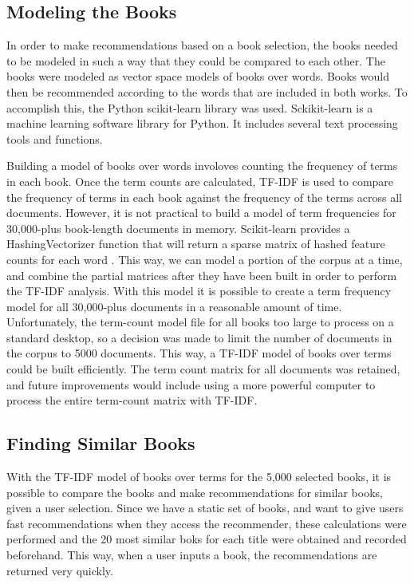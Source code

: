 \documentclass[10pt]{report}
\begin{document}
\subsection*{Modeling the Books}
In order to make recommendations based on a book selection, the books needed to be modeled in such a way that they could be compared to each other. The books were modeled as vector space models of books over words. Books would then be recommended according to the words that are included in both works. To accomplish this, the Python scikit-learn library was used. Sckikit-learn is a machine learning software library for Python. It includes several text processing tools and functions. 

Building a model of books over words involoves counting the frequency of terms in each book. Once the term counts are calculated, TF-IDF is used to compare the frequency of terms in each book against the frequency of the terms across all documents. However, it is not practical to build a model of term frequencies for 30,000-plus book-length documents in memory. Scikit-learn provides a HashingVectorizer function that will return a sparse matrix of hashed feature counts for each word \cite{scikit}. This way, we can model a portion of the corpus at a time, and combine the partial matrices after they have been built in order to perform the TF-IDF analysis. With this model it is possible to create a term frequency model for all 30,000-plus documents in a reasonable amount of time. Unfortunately, the term-count model file for all books too large to process on a standard desktop, so a decision was made to limit the number of documents in the corpus to 5000 documents. This way, a TF-IDF model of books over terms could be built efficiently. The term count matrix for all documents was retained, and future improvements would include using a more powerful computer to process the entire term-count matrix with TF-IDF.

\subsection*{Finding Similar Books}
With the TF-IDF model of books over terms for the 5,000 selected books, it is possible to compare the books and make recommendations for similar books, given a user selection. Since we have a static set of books, and want to give users fast recommendations when they access the recommender, these calculations were performed and the 20 most similar boks for each title were obtained and recorded beforehand. This way, when a user inputs a book, the recommendations are returned very quickly.
\end{document}
